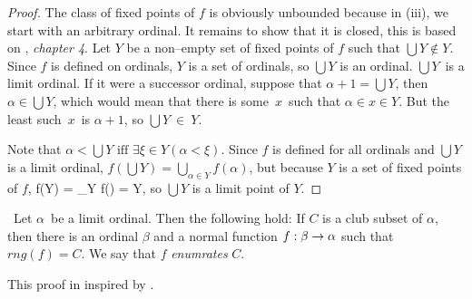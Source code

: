 \begin{proof}
\item The class of fixed points of $f$ is obviously unbounded because in (iii), we start with an arbitrary ordinal.
It remains to show that it is closed, this is based on \cite{DrakeBook}, \emph{chapter 4}. 
Let $Y$ be a non–empty set of fixed points of $f$ such that $\bigcup Y \not\in Y$. Since $f$ is defined on ordinals, $Y$ is a set of ordinals, so $\bigcup Y$ is an ordinal.
$\bigcup Y$ is a limit ordinal. 
If it were a successor ordinal, suppose that $\alpha+1 = \bigcup Y$, then $\alpha \in \bigcup Y$, which would mean that there is some~$x$~such that $\alpha \in x \in Y$. 
But the least such~$x$~is $\alpha+1$, so $\bigcup Y~\in~Y$.

Note that $\alpha < \bigcup Y \mbox{ iff } \exists \xi \in Y (\alpha < \xi)$. Since $f$ is defined for all ordinals and $\bigcup Y$ is a limit ordinal, $f(\bigcup Y) = \bigcup_{\alpha \in Y} f(\alpha)$, but because $Y$ is a set of fixed points of $f$,
\beq
f(\bigcup Y) = \bigcup_{\alpha \in Y} f(\alpha) = \bigcup Y\mbox{,}
\eeq
so $\bigcup Y$ is a limit point of $Y$.
\ece
\end{proof}

\begin{lemma}\label{lemma:normal_enumerates_club}\
Let $\alpha$ be a limit ordinal. Then the following hold:
If $C$ is a club subset of $\alpha$, then there is an ordinal $\beta$ and a normal function $f: \beta \rightarrow \alpha$ such that $rng(f) = C$. We say that $f$ \emph{enumrates} $C$.
\end{lemma}

This proof in inspired by \cite{MonkGradsets09}.

